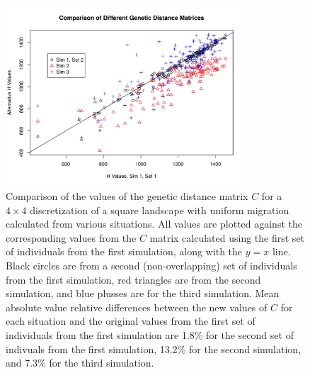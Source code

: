 \documentclass{article}
\begin{document}
\begin{figure}
\centering
    \includegraphics[width=0.8\textwidth]{figs/h_val_comp}
\caption{
    Comparison of the values of the genetic distance matrix $C$
    for a $4 \times 4$ discretization of a square landscape with uniform migration
    calculated from various situations.
    All values are plotted against the corresponding values from the $C$ matrix
    calculated using the first set of individuals from the first simulation,
    along with the $y=x$ line.
    Black circles are from a second (non-overlapping) set of individuals from the first simulation,
    red triangles are from the second simulation, 
    and blue plusses are for the third simulation.
    Mean absolute value relative differences between the new values of $C$ for each situation
    and the original values from the first set of individuals from the first simulation are
    1.8\% for the second set of indivuals from the first simulation,
    13.2\% for the second simulation, 
    and 7.3\% for the third simulation.
    } \label{fig:h_val_comp}
\end{figure}
\end{document}
